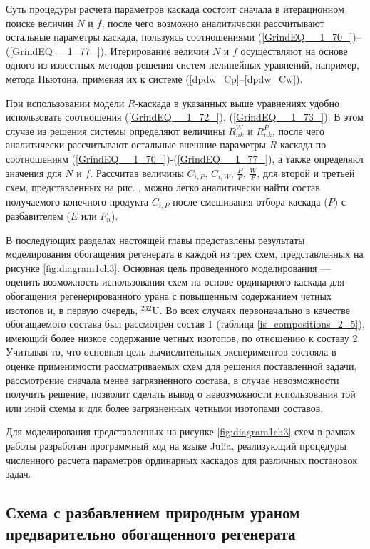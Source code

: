 Суть процедуры расчета параметров каскада состоит сначала в итерационном поиске величин $N$ и $f$, после чего возможно аналитически рассчитывают остальные параметры каскада, пользуясь соотношениями (\ref{GrindEQ__1_70_})--(\ref{GrindEQ__1_77_}). Итерирование величин $N$ и $f$ осуществляют на основе одного из известных методов решения систем нелинейных уравнений, например, метода Ньютона, применяя их к системе (\ref{dpdw_Cp}--\ref{dpdw_Cw}). 

При использовании модели $R$-каскада в указанных выше уравнениях удобно использовать соотношения (\ref{GrindEQ__1_72_}), (\ref{GrindEQ__1_73_}). В этом случае из решения системы определяют величины $R_{n k}^{W}$ и $R_{n k}^{P}$, после чего аналитически рассчитывают остальные внешние параметры $R$-каскада по соотношениям (\ref{GrindEQ__1_70_})-(\ref{GrindEQ__1_77_}), а также определяют значения для $N$ и $f$. Рассчитав величины ${C}_{i,P}$, ${C}_{i,W}$, $\frac{P}{F}$, $\frac{W}{F}$, для второй и третьей схем, представленных на рис. \label{fig:diagram1ch3}, можно легко аналитически найти состав получаемого конечного продукта ${C}_{i,P}$ после смешивания отбора каскада ($P$) с разбавителем ($E$ или $F_n$).

В последующих разделах настоящей главы представлены результаты моделирования обогащения регенерата в каждой из трех схем, представленных на рисунке \ref{fig:diagram1ch3}. 
Основная цель проведенного моделирования --- оценить возможность использования схем на основе ординарного каскада для обогащения регенерированного урана с повышенным содержанием четных изотопов и, в первую очередь, $^{232}$U. Во всех случаях первоначально в качестве обогащаемого состава был рассмотрен состав 1 (таблица \ref{is_compositions_2_5}), имеющий более низкое содержание четных изотопов, по отношению к составу 2. Учитывая то, что основная цель вычислительных экспериментов состояла в оценке применимости рассматриваемых схем для решения поставленной задачи, рассмотрение сначала менее загрязненного состава, в случае невозможности получить решение, позволит сделать вывод о невозможности использования той или иной схемы и для более загрязненных четными изотопами составов.

Для моделирования представленных на рисунке \ref{fig:diagram1ch3} схем в рамках работы разработан программный код на языке Julia, реализующий процедуры численного расчета параметров ординарных каскадов для различных постановок задач.

\subsection{Схема с разбавлением природным ураном предварительно обогащенного регенерата}

